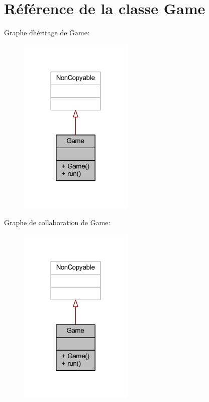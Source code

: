 \hypertarget{class_game}{}\section{Référence de la classe Game}
\label{class_game}


Graphe d\textquotesingle{}héritage de Game\+:\nopagebreak
\begin{figure}[H]
\begin{center}
\leavevmode
\includegraphics[width=154pt]{class_game__inherit__graph}
\end{center}
\end{figure}


Graphe de collaboration de Game\+:\nopagebreak
\begin{figure}[H]
\begin{center}
\leavevmode
\includegraphics[width=154pt]{class_game__coll__graph}
\end{center}
\end{figure}

